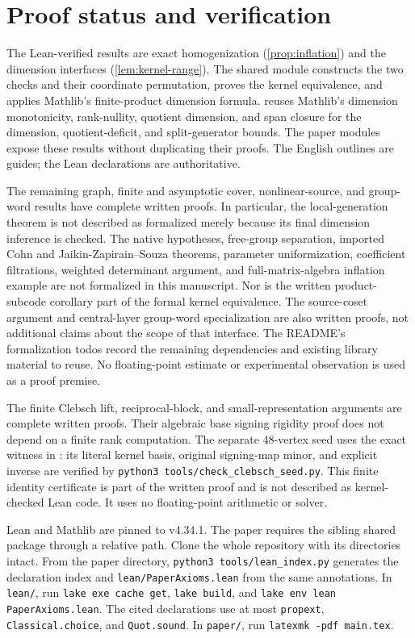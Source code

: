 \section{Proof status and verification}\label{sec:verification}

The Lean-verified results are exact homogenization
(\cref{prop:inflation}) and the dimension interfaces
(\cref{lem:kernel-range}). The shared
 module constructs
the two checks and their coordinate permutation, proves the kernel
equivalence, and applies Mathlib's finite-product dimension formula.
 reuses Mathlib's
dimension monotonicity, rank-nullity, quotient dimension, and span
closure for the dimension, quotient-deficit, and split-generator bounds.
The paper modules expose these results without duplicating their proofs.
The English outlines are guides; the Lean declarations are authoritative.

The remaining graph, finite and asymptotic cover, nonlinear-source, and group-word
results have complete written proofs.
In particular, the local-generation theorem is not described as
formalized merely because its final dimension inference is checked.
The native hypotheses, free-group separation, imported Cohn and
Jaikin-Zapirain--Souza theorems, parameter uniformization, coefficient
filtrations, weighted determinant argument, and full-matrix-algebra
inflation example are not formalized in this manuscript. Nor is the
written product-subcode corollary part of the formal kernel equivalence.
The source-coset argument and central-layer group-word specialization are
also written proofs, not additional claims about the scope of that interface.
The README's formalization todos record the remaining dependencies and
existing library material to reuse. No floating-point estimate or
experimental observation is used as a proof premise.

The finite Clebsch lift, reciprocal-block, and small-representation
arguments are complete written proofs. Their algebraic base signing
rigidity proof does not depend on a finite rank computation. The separate
48-vertex seed uses the exact witness in
: its literal kernel basis,
original signing-map minor, and explicit inverse are verified by
\texttt{python3 tools/check\_clebsch\_seed.py}. This finite identity
certificate is part of the written proof and is not described as
kernel-checked Lean code. It uses no floating-point arithmetic or solver.

Lean and Mathlib are pinned to v4.34.1. The paper requires the
sibling shared package through a relative path. Clone the whole
repository with its directories intact. From the paper directory,
\texttt{python3 tools/lean\_index.py} generates the declaration
index and \texttt{lean/PaperAxioms.lean} from the same annotations.
In \texttt{lean/}, run \texttt{lake exe cache get},
\texttt{lake build}, and \texttt{lake env lean PaperAxioms.lean}.
The cited declarations use at most \texttt{propext},
\texttt{Classical.choice}, and \texttt{Quot.sound}.
In \texttt{paper/}, run \texttt{latexmk -pdf main.tex}.
